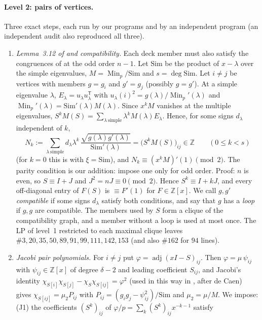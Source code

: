 \documentclass[11pt]{article}
\theoremstyle{definition}
\newcommand{\Z}{\mathbb{Z}}
\newcommand{\Min}{\operatorname{Min}}
\begin{document}
\paragraph{Level 2: pairs of vertices.} Three exact steps, each run by our programs and by an independent
program (an independent audit also reproduced all three).
\begin{enumerate}
\item \emph{Lemma~3.12 of \cite{GY19} and compatibility.} Each deck member must also satisfy the
congruences of \cite[Lemma~3.12]{GY19} at the odd order $n-1$. Let $\mathrm{Sim}$ be the product of
$x-\lambda$ over the simple eigenvalues, $M=\Min_p/\mathrm{Sim}$ and $s=\deg\mathrm{Sim}$. Let $i\ne j$
be vertices with members $g=g_i$ and $g'=g_j$ (possibly $g=g'$). At a simple eigenvalue $\lambda$,
$E_\lambda=u_\lambda u_\lambda^{\mathsf T}$ with $u_\lambda(i)^2=g(\lambda)/\Min_p'(\lambda)$
\cite[Lemma~4.4]{GSY23} and $\Min_p'(\lambda)=\mathrm{Sim}'(\lambda)M(\lambda)$. Since $x^kM$ vanishes
at the multiple eigenvalues, $S^kM(S)=\sum_{\lambda\ \mathrm{simple}}\lambda^kM(\lambda)E_\lambda$.
Hence, for some signs $d_\lambda$ independent of $k$,
\[
N_k:=\sum_{\lambda\ \mathrm{simple}}d_\lambda\lambda^k\,
\frac{\sqrt{g(\lambda)g'(\lambda)}}{\mathrm{Sim}'(\lambda)}=\bigl(S^kM(S)\bigr)_{ij}\in\Z
\qquad(0\le k<s)
\]
(for $k=0$ this is \cite[Lemma~4.7]{GSY23} with $\xi=\mathrm{Sim}$), and $N_k\equiv(x^kM)'(1)\pmod2$.
The parity condition is our addition: \cite{GSY23} impose one only for odd order. Proof: $n$ is even, so
$S\equiv I+J$ and $J^2=nJ\equiv0\pmod2$. Hence $S^k\equiv I+kJ$, and every off-diagonal entry of $F(S)$
is $\equiv F'(1)$ for $F\in\Z[x]$. We call $g,g'$ \emph{compatible} if some signs $d_\lambda$ satisfy
both conditions, and say that $g$ has a \emph{loop} if $g,g$ are compatible. The members used by $S$
form a clique of the compatibility graph, and a member without a loop is used at most once. The LP of
level~1 restricted to each maximal clique leaves $\#3,20,35,50,89,91,99,111,142,153$ (and also
$\#162$ for $94$ lines).
\item \emph{Jacobi pair polynomials.} For $i\ne j$ put $\varphi=\operatorname{adj}(xI-S)_{ij}$. Then
$\varphi=\mu\,\psi_{ij}$ with $\psi_{ij}\in\Z[x]$ of degree $\delta-2$ and leading coefficient $S_{ij}$,
and Jacobi's identity
$\chi_{S[i]}\chi_{S[j]}-\chi_S\chi_{S[ij]}=\varphi^2$ (used in this way in \cite{GS24}, after de Caen)
gives $\chi_{S[ij]}=\mu_2P_{ij}$ with $P_{ij}=(g_ig_j-\psi_{ij}^2)/\mathrm{Sim}$ and $\mu_2=\mu/M$.
We impose: (J1) the coefficients $(S^k)_{ij}$ of $\varphi/p=\sum_k(S^k)_{ij}x^{-k-1}$ satisfy

\end{enumerate}
\end{document}
